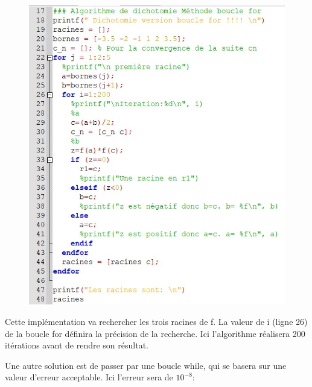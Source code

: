 \documentclass{article}
\begin{document}
	\begin{center}
		\begin{figure}[H]
			\includegraphics[scale=0.7]{./img/algo_racines_f_dicho_forloop.jpg}
		\end{figure}
	\end{center}
	
	Cette implémentation va rechercher les trois racines de f. La valeur de i (ligne 26) de la boucle for définira la précision de la recherche. Ici l'algorithme réalisera 200 itérations avant de rendre son résultat.
	
	Une autre solution est de passer par une boucle while, qui se basera sur une valeur d'erreur acceptable. Ici l'erreur sera de $10^{-8}$:
	
\end{document}
